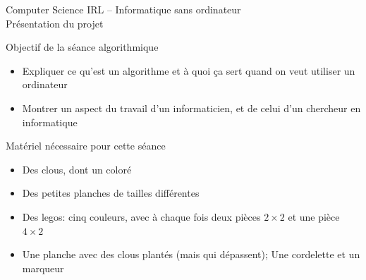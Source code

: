 \documentclass[final,hyperref={pdfpagelabels=false}]{beamer}
\renewcommand*{\large}{\fontsize{\resultlargeX}{\resultlargeY}\selectfont}
\begin{document}
\begin{frame}{Computer Science IRL -- Informatique sans ordinateur\\[-5pt]
  {\large Présentation du projet}}
  \begin{block}{Objectif de la séance algorithmique}
    \begin{itemize}
    \item Expliquer ce qu'est un algorithme et à quoi ça sert quand on veut
      utiliser un ordinateur
    \item Montrer un aspect du travail d'un informaticien, et de celui d'un
      chercheur en informatique
    \end{itemize}
  \end{block}

  \begin{block}{Matériel nécessaire pour cette séance}
    \begin{itemize}
    \item Des clous, dont un coloré
    \item Des petites planches de tailles différentes
    \item Des legos: cinq couleurs, avec à chaque fois deux pièces $2\times2$ et une
      pièce $4\times2$
    \item Une planche avec des clous plantés (mais qui dépassent); Une cordelette et un marqueur
    \end{itemize}
  \end{block}
\end{frame}
\end{document}
